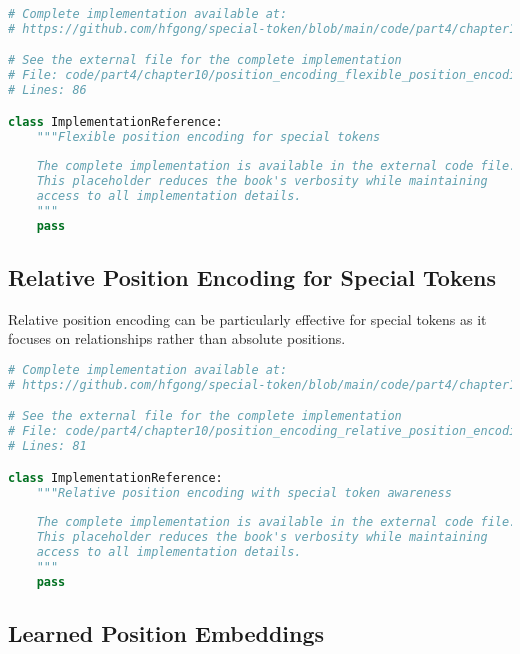 \begin{lstlisting}[language=Python, caption={Flexible position encoding for special tokens}]
# Complete implementation available at:
# https://github.com/hfgong/special-token/blob/main/code/part4/chapter10/position_encoding_flexible_position_encoding_for.py

# See the external file for the complete implementation
# File: code/part4/chapter10/position_encoding_flexible_position_encoding_for.py
# Lines: 86

class ImplementationReference:
    """Flexible position encoding for special tokens
    
    The complete implementation is available in the external code file.
    This placeholder reduces the book's verbosity while maintaining
    access to all implementation details.
    """
    pass
\end{lstlisting}

\subsection{Relative Position Encoding for Special Tokens}

Relative position encoding can be particularly effective for special tokens as it focuses on relationships rather than absolute positions.

\begin{lstlisting}[language=Python, caption={Relative position encoding with special token awareness}]
# Complete implementation available at:
# https://github.com/hfgong/special-token/blob/main/code/part4/chapter10/position_encoding_relative_position_encoding_wit.py

# See the external file for the complete implementation
# File: code/part4/chapter10/position_encoding_relative_position_encoding_wit.py
# Lines: 81

class ImplementationReference:
    """Relative position encoding with special token awareness
    
    The complete implementation is available in the external code file.
    This placeholder reduces the book's verbosity while maintaining
    access to all implementation details.
    """
    pass
\end{lstlisting}

\subsection{Learned Position Embeddings}

